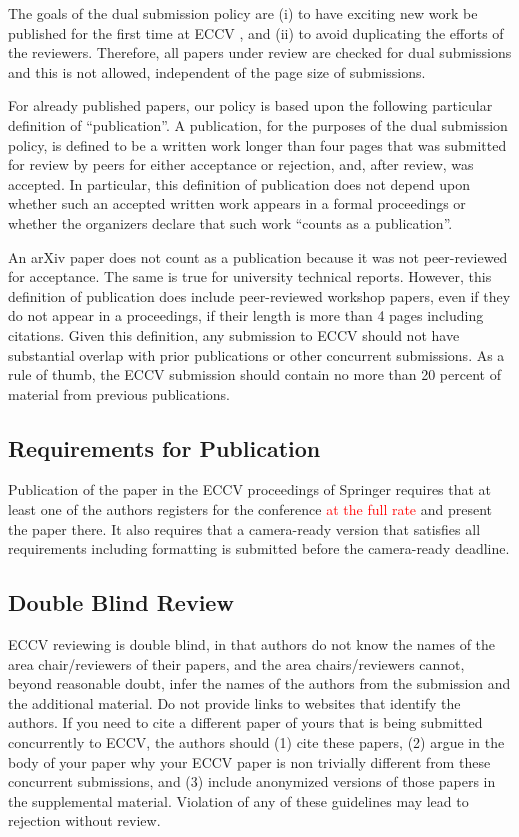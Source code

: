 \documentclass[runningheads]{llncs}
\begin{document}
The goals of the dual submission policy are (i) to have exciting new work be published for the first time at ECCV \ECCVyear{}, and (ii) to avoid duplicating the efforts of the reviewers.
Therefore, all papers under review are checked for dual submissions and this is not allowed, independent of the page size of submissions. 

For already published papers, our policy is based upon the following particular definition of ``publication''. 
A publication, for the purposes of the dual submission policy, is defined to be a written work longer than four pages that was submitted for review by peers for either acceptance or rejection, and, after review, was accepted. 
In particular, this definition of publication does not depend upon whether such an accepted written work appears in a formal proceedings or whether the organizers declare that such work ``counts as a publication''. 

An arXiv paper does not count as a publication because it was not peer-reviewed for acceptance. 
The same is true for university technical reports. 
However, this definition of publication does include peer-reviewed workshop papers, even if they do not appear in a proceedings, if their length is more than 4 pages including citations. 
Given this definition, any submission to ECCV \ECCVyear{} should not have substantial overlap with prior publications or other concurrent submissions. 
As a rule of thumb, the ECCV \ECCVyear{} submission should contain no more than 20 percent of material from previous publications. 


\subsection{Requirements for Publication}
Publication of the paper in the ECCV \ECCVyear{} proceedings of Springer requires that at least one of the authors registers for the conference \textcolor{red}{at the full rate} and present the paper there. 
It also requires that a camera-ready version that satisfies all requirements including formatting is submitted before the camera-ready deadline. 


\subsection{Double Blind Review}
\label{sec:blind}
ECCV reviewing is double blind, in that authors do not know the names of the area chair/reviewers of their papers, and the area chairs/reviewers cannot, beyond reasonable doubt, infer the names of the authors from the submission and the additional material. 
Do not provide links to websites that identify the authors.
If you need to cite a different paper of yours that is being submitted concurrently to ECCV, the authors should (1) cite these papers, (2) argue in the body of your paper why your ECCV paper is non trivially different from these concurrent submissions, and (3) include anonymized versions of those papers in the supplemental material.
Violation of any of these guidelines may lead to rejection without review. 
\end{document}
